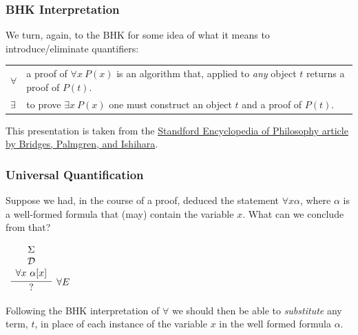 \documentclass{beamer}
\theoremstyle{indentDefn} \newtheorem{defn}[]{Definition}
\begin{document}
\begin{frame}
	\frametitle{BHK Interpretation}
	
	We turn, again, to the BHK for some idea of what it means to introduce/eliminate quantifiers: 
	
	\vspace{0.2cm}
	
	\begin{center}
		\begin{tabular}{p{1.5cm}p{8cm}}
		$\forall$ & a proof of $\forall x \ P(x)$ is an algorithm that, applied to \emph{any} object $t$ returns a proof of $P(t)$.\\
		$\exists$ & to prove $\exists x \ P(x)$ one must construct an object $t$ and a proof of $P(t)$. 
		\end{tabular}
	\end{center}
	
	This presentation is taken from the \href{https://plato.stanford.edu/archIves/fall2024/entries/mathematics-constructive/}{Standford Encyclopedia of Philosophy article by Bridges, Palmgren, and Ishihara}.

\end{frame}

\begin{frame}
	\frametitle{Universal Quantification}
	
	Suppose we had, in the course of a proof, deduced the statement $\forall x \alpha$, where $\alpha$ is a well-formed formula that (may) contain the variable $x$. What can we conclude from that? 
	
	\vspace{5mm}
	
	\begin{center}
	$\begin{array}{c}
		\infer[\forall E]{\hspace{0.3cm} ? \hspace{0.3cm}}{\begin{array}{c} 
			\Sigma \\
			\mathcal{D} \\ 
			\forall x \ \alpha[x]			
			\end{array}}
	\end{array}$
	\end{center}

	Following the BHK interpretation of $\forall$ we should then be able to \emph{substitute} any term, $t$, in place of each instance of the variable $x$ in the well formed formula $\alpha$.
\end{frame}
\end{document}
